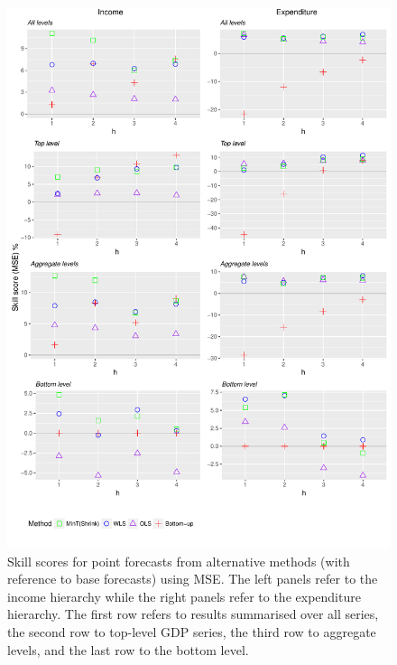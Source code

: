 \documentclass[a4paper, 11pt]{article}
\begin{document}
\begin{figure}
	\centering
	\small
	\includegraphics[width=\textwidth]{Figs/Results/PointF_MSE.pdf}
	\caption{Skill scores for point forecasts from alternative methods (with reference to base forecasts) using MSE\@. The left panels refer to the income hierarchy while the right panels refer to the expenditure hierarchy. The first row refers to results summarised over all series, the second row to top-level GDP series, the third row to aggregate levels, and the last row to the bottom level.}
	\label{fig: PointF_MSE}
\end{figure}
\end{document}
